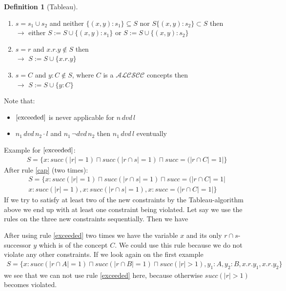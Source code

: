 \documentclass[a4paper,11pt]{scrartcl}
\theoremstyle{definition}
\newtheorem{mydef}{Definition}
\begin{document}
\begin{mydef}[Tableau]
\begin{enumerate}
\begin{enumerate}
\item\label{setterm2} $s=s_1\cup s_2$ and neither $\{(x,y):s_1\}\subseteq S$ nor $S\{(x,y):s_2\}\subset S$ then\\
$\rightarrow$ either $S:=S\cup \{(x,y):s_1\}$ or $S:=S\cup \{(x,y):s_2\}$ 
\item\label{setterm3} $s=r$ and $x.r.y\notin S$ then \\
$\rightarrow$ $S:=S\cup\{x.r.y\}$
\item\label{setterm4} $s=C$ and $y:C\notin S$, where $C$ is a $\mathcal{ALCSCC}$ concepts then \\
$\rightarrow$ $S:=S\cup\{y:C\}$
\end{enumerate}
\end{enumerate}
\end{mydef}
Note that:
\begin{itemize}
\item $\ref{exceeded}$ is never applicable for $n\, dvd\, l$
\item $n_1\,dvd\,n_2\cdot l$ and $n_1\,\neg dvd\,n_2$ then $n_1\,dvd\,l$ eventually
\end{itemize}
Example for $\ref{exceeded}$:\\
\begin{align*}
S=\{x:succ(|r|=1)\sqcap succ(|r\cap s|=1)\sqcap succ=(|r\cap C|=1|\}
\end{align*}
After rule \ref{cap} (two times):
\begin{align*}
S=\{x:succ(|r|=1)\sqcap succ(|r\cap s|=1)\sqcap succ=(|r\cap C|=1|\\
x:succ(|r|=1), x:succ(|r\cap s|=1), x:succ=(|r\cap C|=1|
\}
\end{align*}
If we try to satisfy at least two of the new constraints by the Tableau-algorithm above we end up with at least one constraint being violated. Let say we use the rules on the three new constraints sequentially. Then we have 
\begin{figure}[H]
\centering
{}
\end{figure}
After using rule \ref{exceeded} two times we have the variable $x$ and its only $r\cap s$-successor $y$ which is of the concept $C$. We could use this rule because we do not violate any other constraints. 
If we look again on the first example
\begin{align*}
S=\{x:succ(|r\cap A|=1)\sqcap succ(|r\cap B|=1)\sqcap succ(|r|>1), y_1:A, y_2:B, x.r.y_1, x.r.y_2\}
\end{align*}
we see that we can not use rule \ref{exceeded} here, because otherwise $succ(|r|>1)$ becomes violated.\\
\end{document}
